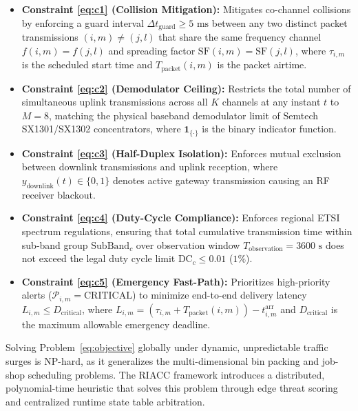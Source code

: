 \documentclass[preprint,review,12pt]{elsarticle}
\begin{document}
\begin{itemize}

    \item \textbf{Constraint \eqref{eq:c1} (Collision Mitigation):} Mitigates co-channel collisions by enforcing a guard interval $\Delta t_{\text{guard}} \ge 5\text{ ms}$ between any two distinct packet transmissions $(i,m) \ne (j,l)$ that share the same frequency channel $f(i,m) = f(j,l)$ and spreading factor $\text{SF}(i,m) = \text{SF}(j,l)$, where $\tau_{i,m}$ is the scheduled start time and $T_{\text{packet}}(i,m)$ is the packet airtime.

    \item \textbf{Constraint \eqref{eq:c2} (Demodulator Ceiling):} Restricts the total number of simultaneous uplink transmissions across all $K$ channels at any instant $t$ to $M = 8$, matching the physical baseband demodulator limit of Semtech SX1301/SX1302 concentrators, where $\mathbf{1}_{\{\cdot\}}$ is the binary indicator function.

    \item \textbf{Constraint \eqref{eq:c3} (Half-Duplex Isolation):} Enforces mutual exclusion between downlink transmissions and uplink reception, where $y_{\text{downlink}}(t) \in \{0, 1\}$ denotes active gateway transmission causing an RF receiver blackout.

    \item \textbf{Constraint \eqref{eq:c4} (Duty-Cycle Compliance):} Enforces regional ETSI spectrum regulations, ensuring that total cumulative transmission time within sub-band group $\text{SubBand}_c$ over observation window $T_{\text{observation}} = 3600\text{ s}$ does not exceed the legal duty cycle limit $\text{DC}_c \le 0.01$ ($1\%$).

    \item \textbf{Constraint \eqref{eq:c5} (Emergency Fast-Path):} Prioritizes high-priority alerts ($\mathcal{P}_{i,m} = \text{CRITICAL}$) to minimize end-to-end delivery latency $L_{i,m} \le D_{\text{critical}}$, where $L_{i,m} = (\tau_{i,m} + T_{\text{packet}}(i,m)) - t_{i,m}^{\text{arr}}$ and $D_{\text{critical}}$ is the maximum allowable emergency deadline.

\end{itemize}

Solving Problem~\eqref{eq:objective} globally under dynamic, unpredictable traffic surges is NP-hard, as it generalizes the multi-dimensional bin packing and job-shop scheduling problems. The RIACC framework introduces a distributed, polynomial-time heuristic that solves this problem through edge threat scoring and centralized runtime state table arbitration.
\end{document}
